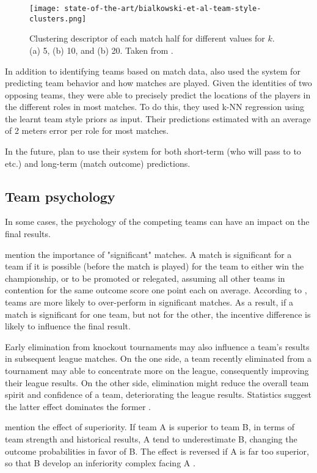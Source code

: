 \begin{figure}
    \centering
    \texttt{[image: state-of-the-art/bialkowski-et-al-team-style-clusters.png]}
    \caption{Clustering descriptor of each match half for different values for $k$. (a) 5, (b) 10, and (b) 20. Taken from \citet{bib:bialkowski-lucey-carr-yue-sridharan-matthews-2014}.}
    \label{fig:bialkowski-et-al-team-style-clusters}
\end{figure}

In addition to identifying teams based on match data, \citet{bib:bialkowski-lucey-carr-yue-sridharan-matthews-2014} also used the system for predicting team behavior and how matches are played. Given the identities of two opposing teams, they were able to precisely predict the locations of the players in the different roles in most matches. To do this, they used k-NN regression using the learnt team style priors as input. Their predictions estimated with an average of 2 meters error per role for most matches.

In the future, \citet{bib:bialkowski-lucey-carr-yue-sridharan-matthews-2014} plan to use their system for both short-term (who will pass to to etc.) and long-term (match outcome) predictions.


\subsection{Team psychology}

In some cases, the psychology of the competing teams can have an impact on the final results.

\citet{bib:goddard-asimakopoulos-2004} mention the importance of "significant" matches. A match is significant for a team if it is possible (before the match is played) for the team to either win the championship, or to be promoted or relegated, assuming all other teams in contention for the same outcome score one point each on average. According to \citet{bib:goddard-asimakopoulos-2004}, teams are more likely to over-perform in significant matches. As a result, if a match is significant for one team, but not for the other, the incentive difference is likely to influence the final result.

Early elimination from knockout tournaments may also influence a team's results in subsequent league matches. On the one side, a team recently eliminated from a tournament may able to concentrate more on the league, consequently improving their league results. On the other side, elimination might reduce the overall team spirit and confidence of a team, deteriorating the league results. Statistics suggest the latter effect dominates the former \citep{bib:goddard-asimakopoulos-2004}.

\citet{bib:rue-salvesen-2000} mention the effect of superiority. If team A is superior to team B, in terms of team strength and historical results, A tend to underestimate B, changing the outcome probabilities in favor of B. The effect is reversed if A is far too superior, so that B develop an inferiority complex facing A \citep{bib:rue-salvesen-2000}.
